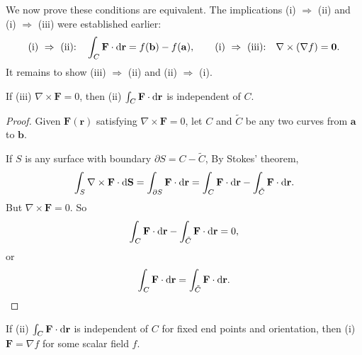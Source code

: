 \documentclass[a4paper]{article}
\begin{document}
We now prove these conditions are equivalent. The implications (i) $\Rightarrow$ (ii) and (i) $\Rightarrow$ (iii) were established earlier:
\[
  \text{(i) } \Rightarrow \text{ (ii):} \quad \int_C \mathbf{F}\cdot \mathrm{d} \mathbf{r} = f(\mathbf{b}) - f(\mathbf{a}), \qquad
  \text{(i) } \Rightarrow \text{ (iii):} \quad \nabla \times (\nabla f) = \mathbf{0}.
\]
It remains to show (iii) $\Rightarrow$ (ii) and (ii) $\Rightarrow$ (i).
\begin{prop}
  If (iii) $\nabla\times \mathbf{F}= 0 $, then (ii) $\int_C \mathbf{F}\cdot \mathrm{d} \mathbf{r}$ is independent of $C$.
\end{prop}

\begin{proof}
  Given $\mathbf{F}(\mathbf{r})$ satisfying $\nabla\times \mathbf{F} = 0$, let $C$ and $\tilde C$ be any two curves from $\mathbf{a}$ to $\mathbf{b}$.
  \begin{center}
  \end{center}
  If $S$ is any surface with boundary $\partial S = C - \tilde C$, By Stokes' theorem,
  \[
    \int_{S}\nabla \times \mathbf{F}\cdot \mathrm{d} \mathbf{S} = \int_{\partial S}\mathbf{F}\cdot \mathrm{d} \mathbf{r} = \int_C \mathbf{F}\cdot \mathrm{d} \mathbf{r} - \int_{\tilde{C}}\mathbf{F}\cdot \mathrm{d} \mathbf{r}.
  \]
  But $\nabla\times \mathbf{F} = 0$. So
  \[
    \int_C \mathbf{F}\cdot \mathrm{d} \mathbf{r} - \int_{\tilde{C}} \mathbf{F}\cdot \mathrm{d} \mathbf{r} = 0,
  \]
  or
  \[
    \int_C \mathbf{F}\cdot \mathrm{d} \mathbf{r} = \int_{\tilde{C}}\mathbf{F}\cdot \mathrm{d} \mathbf{r}.\qedhere
  \]
\end{proof}

\begin{prop}
  If (ii) $\int_C \mathbf{F}\cdot \mathrm{d} \mathbf{r}$ is independent of $C$ for fixed end points and orientation, then (i) $\mathbf{F} = \nabla f$ for some scalar field $f$.
\end{prop}
\end{document}
